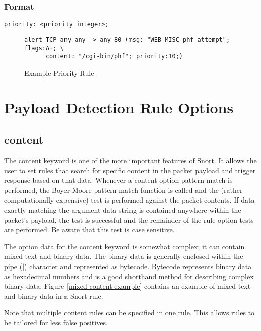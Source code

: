 \documentclass[english]{report}
\begin{document}
\subsubsection{Format}

\begin{verbatim}
priority: <priority integer>;
\end{verbatim}

\begin{figure}[!hbpt]
\begin{verbatim}
alert TCP any any -> any 80 (msg: "WEB-MISC phf attempt"; flags:A+; \
      content: "/cgi-bin/phf"; priority:10;)
\end{verbatim}

\caption{Example Priority Rule\label{example priority rule}}
\end{figure}



\section{Payload Detection Rule Options}
\subsection{content\label{sub:content}}

The content keyword is one of the more important features of Snort.
It allows the user to set rules that search for specific content in
the packet payload and trigger response based on that data. Whenever
a content option pattern match is performed, the Boyer-Moore pattern
match function is called and the (rather computationally expensive)
test is performed against the packet contents. If data exactly matching
the argument data string is contained anywhere within the packet's
payload, the test is successful and the remainder of the rule option
tests are performed. Be aware that this test is case sensitive.

The option data for the content keyword is somewhat complex; it can
contain mixed text and binary data. The binary data is generally enclosed
within the pipe ($|$) character and represented
as bytecode. Bytecode represents binary data as hexadecimal numbers
and is a good shorthand method for describing complex binary data.
Figure \ref{mixed content example} contains an example of mixed text
and binary data in a Snort rule. 

Note that multiple content rules can be specified in one rule. This
allows rules to be tailored for less false positives. 
\end{document}

